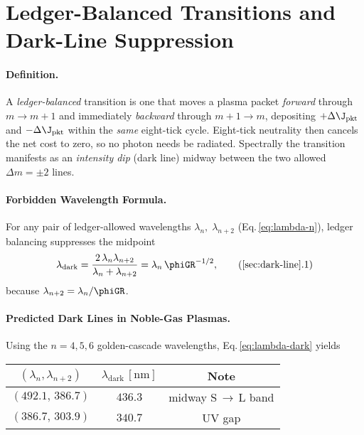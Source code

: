 \documentclass[11pt,oneside]{book}
\begin{document}
{%
\section{Ledger-Balanced Transitions and Dark-Line Suppression}
\label{sec:dark-line}

\paragraph{Definition.}
A \emph{ledger-balanced} transition is one that moves a plasma packet
\textit{forward} through $m\!\to\!m+1$ and immediately \textit{backward}
through $m\!+\!1\!\to\!m$, depositing 
\(
   +\Delta\J_{\text{pkt}}
\)
and
\(
   -\Delta\J_{\text{pkt}}
\)
within the \emph{same} eight-tick cycle.
Eight-tick neutrality then cancels the net cost to zero, so no photon
needs be radiated.  
Spectrally the transition manifests as an \emph{intensity dip}
(dark line) midway between the two allowed $\Delta m=\pm2$ lines.

\paragraph{Forbidden Wavelength Formula.}
For any pair of ledger-allowed wavelengths
\(
   \lambda_{n},\;\lambda_{n+2}
\)
(Eq.\,\ref{eq:lambda-n}),
ledger balancing suppresses the midpoint
\[
   \lambda_{\text{dark}}
   =
   \frac{2\,\lambda_{n}\lambda_{n+2}}
        {\lambda_{n}+\lambda_{n+2}}
   =
   \lambda_{n}\,\phiGR^{-1/2},
   \tag{\ref*{sec:dark-line}.1}\label{eq:lambda-dark}
\]
because \(\lambda_{n+2}=\lambda_{n}/\phiGR\).

\paragraph{Predicted Dark Lines in Noble-Gas Plasmas.}
Using the $n=4,5,6$ golden-cascade wavelengths,
Eq.\,\eqref{eq:lambda-dark} yields

\begin{center}
\begin{tabular}{ccc}
\toprule
$(\lambda_{n},\lambda_{n+2})$ & $\lambda_{\text{dark}}\,[\mathrm{nm}]$ & Note\\
\midrule
$(492.1,\,386.7)$ & $436.3$ & midway S\,$\rightarrow$\,L band\\
$(386.7,\,303.9)$ & $340.7$ & UV gap\\
\bottomrule
\end{tabular}
\end{center}

}
\end{document}
